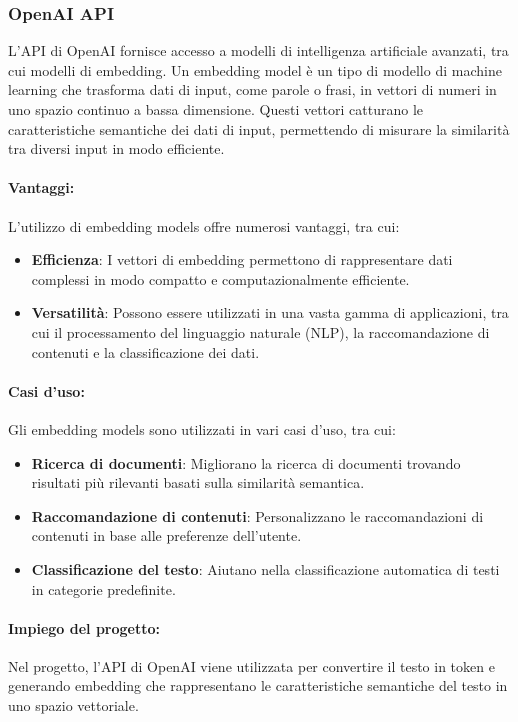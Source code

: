 \subsubsection{OpenAI API}
L'API di OpenAI fornisce accesso a modelli di intelligenza artificiale avanzati, tra cui modelli di embedding. Un embedding model è un tipo di modello di machine learning che trasforma dati di input, come parole o frasi, in vettori di numeri in uno spazio continuo a bassa dimensione. Questi vettori catturano le caratteristiche semantiche dei dati di input, permettendo di misurare la similarità tra diversi input in modo efficiente.

\paragraph{Vantaggi:}
L'utilizzo di embedding models offre numerosi vantaggi, tra cui:
\begin{itemize}
    \item \textbf{Efficienza}: I vettori di embedding permettono di rappresentare dati complessi in modo compatto e computazionalmente efficiente.
    \item \textbf{Versatilità}: Possono essere utilizzati in una vasta gamma di applicazioni, tra cui il processamento del linguaggio naturale (NLP), la raccomandazione di contenuti e la classificazione dei dati.
\end{itemize}

\paragraph{Casi d'uso:}
Gli embedding models sono utilizzati in vari casi d'uso, tra cui:
\begin{itemize}
    \item \textbf{Ricerca di documenti}: Migliorano la ricerca di documenti trovando risultati più rilevanti basati sulla similarità semantica.
    \item \textbf{Raccomandazione di contenuti}: Personalizzano le raccomandazioni di contenuti in base alle preferenze dell'utente.
    \item \textbf{Classificazione del testo}: Aiutano nella classificazione automatica di testi in categorie predefinite.
\end{itemize}

\paragraph{Impiego del progetto:}
Nel progetto, l'API di OpenAI viene utilizzata per convertire il testo in token e generando embedding che rappresentano le caratteristiche semantiche del testo in uno spazio vettoriale.

